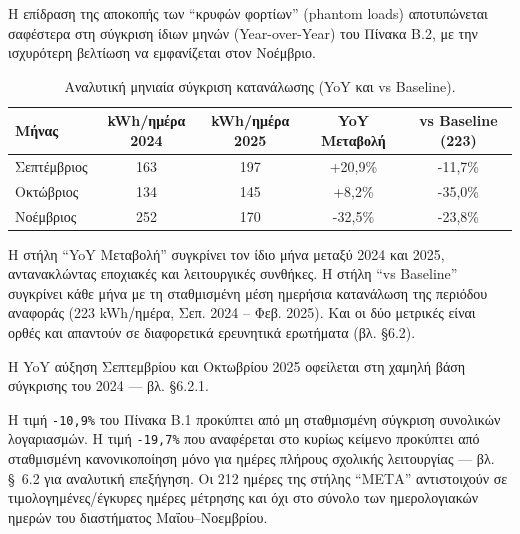 \noindent Η επίδραση της αποκοπής των ``κρυφών φορτίων'' (\textlatin{phantom loads}) αποτυπώνεται σαφέστερα στη σύγκριση ίδιων μηνών (\textlatin{Year-over-Year}) του Πίνακα Β.2, με την ισχυρότερη βελτίωση να εμφανίζεται στον Νοέμβριο.

\begin{table}[htbp]
\centering
\caption{Αναλυτική μηνιαία σύγκριση κατανάλωσης (\textlatin{YoY} και \textlatin{vs Baseline}).}
\label{tab:appendix_energy_yoy}
\begin{tabular}{@{}lcccc@{}}
\toprule
\textbf{Μήνας} & \textbf{\textlatin{kWh}/ημέρα 2024} & \textbf{\textlatin{kWh}/ημέρα 2025} & \textlatin{YoY} \textbf{Μεταβολή} & \textbf{\textlatin{vs Baseline (223)}} \\
\midrule
Σεπτέμβριος & 163 & 197 & +20,9\% & -11,7\% \\
Οκτώβριος & 134 & 145 & +8,2\% & -35,0\% \\
Νοέμβριος & 252 & 170 & -32,5\% & -23,8\% \\
\bottomrule
\end{tabular}
\end{table}

\noindent Η στήλη ``\textlatin{YoY} Μεταβολή'' συγκρίνει τον ίδιο μήνα μεταξύ 2024 και 2025, αντανακλώντας εποχιακές και λειτουργικές συνθήκες. Η στήλη ``\textlatin{vs Baseline}'' συγκρίνει κάθε μήνα με τη σταθμισμένη μέση ημερήσια κατανάλωση της περιόδου αναφοράς (223 \textlatin{kWh}/ημέρα, Σεπ. 2024 -- Φεβ. 2025). Και οι δύο μετρικές είναι ορθές και απαντούν σε διαφορετικά ερευνητικά ερωτήματα (βλ. §6.2).

\noindent Η \textlatin{YoY} αύξηση Σεπτεμβρίου και Οκτωβρίου 2025 οφείλεται στη χαμηλή βάση σύγκρισης του 2024 --- βλ. §6.2.1.


\noindent Η τιμή \texttt{-10,9\%} του Πίνακα Β.1 προκύπτει από μη σταθμισμένη σύγκριση συνολικών λογαριασμών. Η τιμή \texttt{-19,7\%} που αναφέρεται στο κυρίως κείμενο προκύπτει από σταθμισμένη κανονικοποίηση μόνο για ημέρες πλήρους σχολικής λειτουργίας --- βλ. \S~6.2 για αναλυτική επεξήγηση. Οι 212 ημέρες της στήλης ``ΜΕΤΑ'' αντιστοιχούν σε τιμολογημένες/έγκυρες ημέρες μέτρησης και όχι στο σύνολο των ημερολογιακών ημερών του διαστήματος Μαΐου--Νοεμβρίου.

